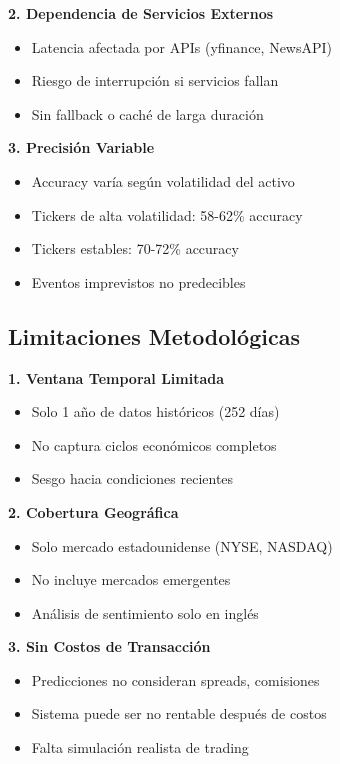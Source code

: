 \documentclass[12pt,a4paper]{article}
\begin{document}
\textbf{2. Dependencia de Servicios Externos}
\begin{itemize}
    \item Latencia afectada por APIs (yfinance, NewsAPI)
    \item Riesgo de interrupción si servicios fallan
    \item Sin fallback o caché de larga duración
\end{itemize}

\textbf{3. Precisión Variable}
\begin{itemize}
    \item Accuracy varía según volatilidad del activo
    \item Tickers de alta volatilidad: 58-62\% accuracy
    \item Tickers estables: 70-72\% accuracy
    \item Eventos imprevistos no predecibles
\end{itemize}

\subsection{Limitaciones Metodológicas}

\textbf{1. Ventana Temporal Limitada}
\begin{itemize}
    \item Solo 1 año de datos históricos (252 días)
    \item No captura ciclos económicos completos
    \item Sesgo hacia condiciones recientes
\end{itemize}

\textbf{2. Cobertura Geográfica}
\begin{itemize}
    \item Solo mercado estadounidense (NYSE, NASDAQ)
    \item No incluye mercados emergentes
    \item Análisis de sentimiento solo en inglés
\end{itemize}

\textbf{3. Sin Costos de Transacción}
\begin{itemize}
    \item Predicciones no consideran spreads, comisiones
    \item Sistema puede ser no rentable después de costos
    \item Falta simulación realista de trading
\end{itemize}
\end{document}
